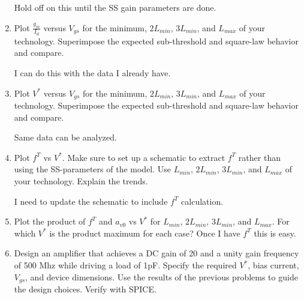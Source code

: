 \begin{enumerate}
    Hold off on this until the SS gain parameters are done.

\item {\color{blue}Plot $\frac{g_m}{I_d}$ versus $V_{gs}$ for the minimum, $2 L_{min}$, $3 L_{min}$, and $L_{max}$ of your technology. Superimpose the expected sub-threshold and square-law behavior and compare.}

    I can do this with the data I already have.

\item {\color{blue}Plot $V^*$ versus $V_{gs}$ for the minimum, $2 L_{min}$, $3 L_{min}$, and $L_{max}$ of your technology. Superimpose the expected sub-threshold and square-law behavior and compare.}

    Same data can be analyzed.

\item {\color{blue}Plot $f^T$ vs $V^*$. Make sure to set up a schematic to extract $f^T$ rather than using the SS-parameters of the model. Use $L_{min}$, $2 L_{min}$, $3 L_{min}$, and $L_{max}$ of your technology. Explain the trends.}

    I need to update the schematic to include $f^T$ calculation.

\item {\color{blue}Plot the product of $f^T$ and $a_{v0}$ vs $V^*$ for $L_{min}$, $2 L_{min}$, $3 L_{min}$, and $L_{max}$. For which $V^*$ is the product maximum for each case?}
    Once I have $f^T$ this is easy.

\item {\color{blue} Design an amplifier that achieves a DC gain of 20 and a unity gain frequency of 500 Mhz while driving a load of 1pF. Specify the required $V^*$, bias current, $V_{gs}$, and device dimensions. Use the results of the previous problems to guide the design choices. Verify with SPICE.}
\end{enumerate}

